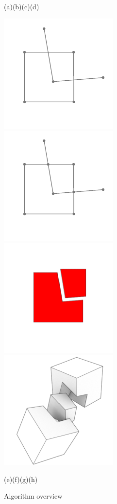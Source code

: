 \begin{figure}[h]
\begin{center}
        (a)\hspace{.22\textwidth}(b)\hspace{.22\textwidth}(c)\hspace{.22\textwidth}(d)
    \end{center}
    
    \begin{center}
        \includegraphics[width=.25\textwidth]{./img/ch1-5.pdf}%
        \includegraphics[width=.25\textwidth]{./img/ch1-6.pdf}%
        \includegraphics[width=.25\textwidth]{./img/ch1-7.pdf}%
        \includegraphics[width=.25\textwidth]{./img/ch1-8.pdf}%

        (e)\hspace{.22\textwidth}(f)\hspace{.22\textwidth}(g)\hspace{.22\textwidth}(h)
    \end{center}
    \caption{Algorithm overview}
    \label{img:spatial}
\end{figure}

